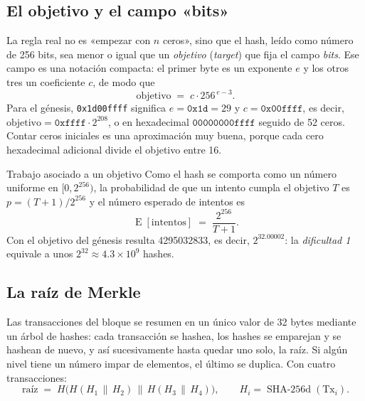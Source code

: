\documentclass[11pt,a4paper]{article}
\newcommand{\Esp}[1]{\operatorname{E}\!\left[#1\right]}
\newcommand{\SHAd}{\operatorname{SHA\text{-}256d}}
\begin{document}
\subsection{El objetivo y el campo «bits»}

La regla real no es «empezar con $n$ ceros», sino que el hash, leído como número de 256 bits, sea menor o igual que un \emph{objetivo} (\emph{target}) que fija el campo \emph{bits}. Ese campo es una notación compacta: el primer byte es un exponente $e$ y los otros tres un coeficiente $c$, de modo que
\[
  \text{objetivo}\;=\;c\cdot 256^{\,e-3}.
\]
Para el génesis, \texttt{0x1d00ffff} significa $e=\mathtt{0x1d}=29$ y $c=\mathtt{0x00ffff}$, es decir, $\text{objetivo}=\mathtt{0xffff}\cdot 2^{208}$, o en hexadecimal $\mathtt{00000000ffff}$ seguido de 52 ceros. Contar ceros iniciales es una aproximación muy buena, porque cada cero hexadecimal adicional divide el objetivo entre 16.

\begin{resultado}{Trabajo asociado a un objetivo}\label{res:trabajo-objetivo}
Como el hash se comporta como un número uniforme en $[0,2^{256})$, la probabilidad de que un intento cumpla el objetivo $T$ es $p=(T+1)/2^{256}$ y el número esperado de intentos es
\[
  \Esp{\text{intentos}}\;=\;\frac{2^{256}}{T+1}.
\]
Con el objetivo del génesis resulta \num{4295032833}, es decir, $2^{32.00002}$: la \emph{dificultad 1} equivale a unos $2^{32}\approx 4.3\times10^{9}$ hashes.
\end{resultado}

\subsection{La raíz de Merkle}

Las transacciones del bloque se resumen en un único valor de 32 bytes mediante un árbol de hashes: cada transacción se hashea, los hashes se emparejan y se hashean de nuevo, y así sucesivamente hasta quedar uno solo, la raíz. Si algún nivel tiene un número impar de elementos, el último se duplica. Con cuatro transacciones:
\[
  \text{raíz}\;=\;H\bigl(H(H_1\,\|\,H_2)\,\|\,H(H_3\,\|\,H_4)\bigr),\qquad H_i=\SHAd(\text{Tx}_i).
\]
\end{document}
